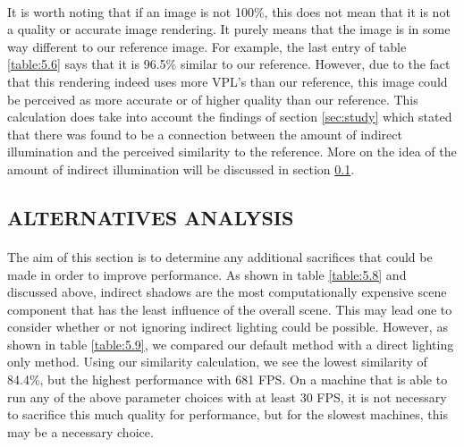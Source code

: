 \paragraph{}
It is worth noting that if an image is not 100\%, this does not mean that it is not a quality or accurate image rendering.  It purely means that the image is in some way different to our reference image.  For example, the last entry of table \ref{table:5.6} says that it is 96.5\% similar to our reference.  However, due to the fact that this rendering indeed uses more VPL's than our reference, this image could be perceived as more accurate or of higher quality than our reference.  This calculation does take into account the findings of section \ref{sec:study} which stated that there was found to be a connection between the amount of indirect illumination and the perceived similarity to the reference.  More on the idea of the amount of indirect illumination will be discussed in section \ref{sec:alternatives}.

\subsection{ALTERNATIVES ANALYSIS} \label{sec:alternatives}
\paragraph{}
The aim of this section is to determine any additional sacrifices that could be made in order to improve performance.  As shown in table \ref{table:5.8} and discussed above, indirect shadows are the most computationally expensive scene component that has the least influence of the overall scene.  This may lead one to consider whether or not ignoring indirect lighting could be possible.  However, as shown in table \ref{table:5.9}, we compared our default method with a direct lighting only method.  Using our similarity calculation, we see the lowest similarity of 84.4\%, but the highest performance with 681 FPS.  On a machine that is able to run any of the above parameter choices with at least 30 FPS, it is not necessary to sacrifice this much quality for performance, but for the slowest machines, this may be a necessary choice.

